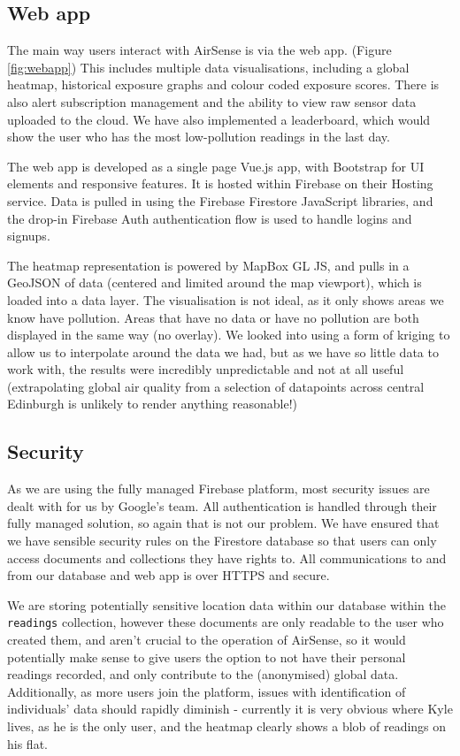 \documentclass[sigconf, nonacm]{acmart}
\begin{document}
\subsection{Web app}

The main way users interact with AirSense is via the web app. (Figure \ref{fig:webapp}) This includes multiple data visualisations,
including a global heatmap, historical exposure graphs and colour coded exposure scores. There is also
alert subscription management and the ability to view raw sensor data uploaded to the cloud. We have
also implemented a leaderboard, which would show the user who has the most low-pollution readings in the
last day.

The web app is developed as a single page Vue.js\cite{vuejs_home} app, with Bootstrap for UI elements and responsive 
features. It is hosted within Firebase on their Hosting service\cite{firebase_hosting}. Data is pulled in using the Firebase
Firestore JavaScript libraries, and the drop-in Firebase Auth authentication flow is used to handle
logins and signups.

The heatmap representation is powered by MapBox GL JS\cite{mapbox_intro}, and pulls in a GeoJSON of data (centered and
limited around the map viewport), which is loaded into a data layer. The visualisation is not ideal,
as it only shows areas we know have pollution. Areas that have no data or have no pollution are both
displayed in the same way (no overlay). We looked into using a form of kriging to allow us to interpolate
around the data we had, but as we have so little data to work with, the results were incredibly 
unpredictable and not at all useful (extrapolating global air quality from a selection of datapoints
across central Edinburgh is unlikely to render anything reasonable!)

\subsection{Security}

As we are using the fully managed Firebase platform, most security issues are dealt with for us by
Google's team. All authentication is handled through their fully managed solution, so again that is
not our problem. We have ensured that we have sensible security rules\cite{firebase_security} on the Firestore database so
that users can only access documents and collections they have rights to. All communications to
and from our database and web app is over HTTPS and secure.

We are storing potentially sensitive location data within our database within the \texttt{readings} 
collection, however these documents are only readable to the user who created them, and aren't 
crucial to the operation of AirSense, so it would potentially make sense to give users the option
to not have their personal readings recorded, and only contribute to the (anonymised) global
data. Additionally, as more users join the platform, issues with identification of individuals' data
should rapidly diminish - currently it is very obvious where Kyle lives, as he is the only user, and
the heatmap clearly shows a blob of readings on his flat.
\end{document}
